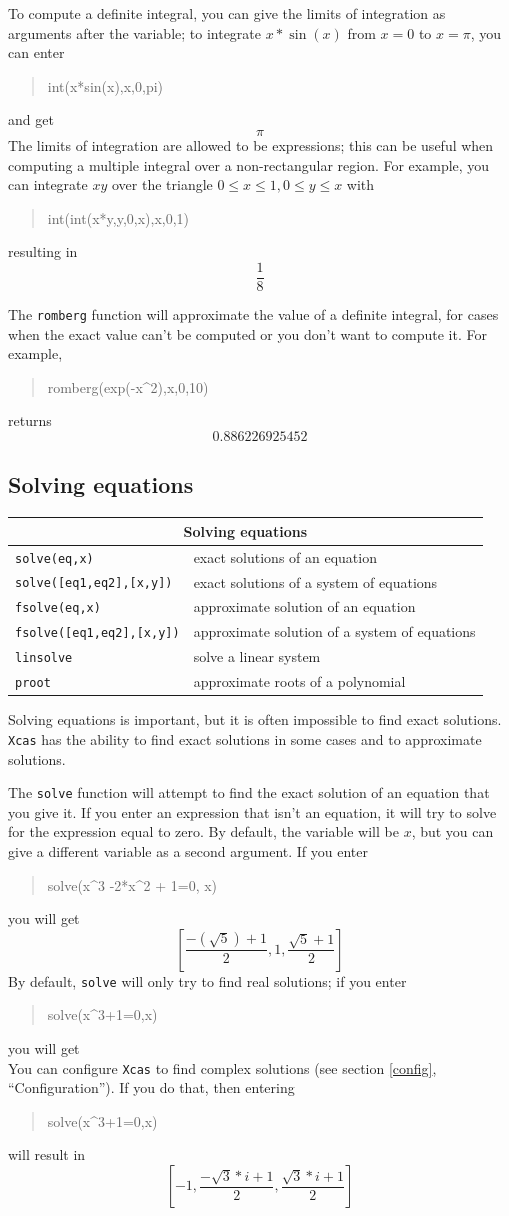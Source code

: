 \documentclass{article}
\newcommand{\xcasin}[1]
{\begin{quote}\ttfamily
#1
\end{quote}}
\newcommand{\xcasout}[1]
{\begin{equation*}
#1
\end{equation*}}
\begin{document}
To compute a definite integral, you can give the limits of integration
as arguments after the variable; to integrate $x*\sin(x)$ from $x=0$ to
$x=\pi$, you can enter
\xcasin{int(x*sin(x),x,0,pi)}
and get
\xcasout{\pi}
The limits of integration are allowed to be expressions; this can be
useful when computing a multiple integral over a non-rectangular
region.  For example, you can integrate $x y$ over the triangle $0 \le
x \le 1, 0 \le y \le x$ with
\xcasin{int(int(x*y,y,0,x),x,0,1)}
resulting in
\xcasout{\frac{1}{8}}

The \texttt{romberg} function will approximate the value of a definite
integral, for cases when the exact value can't be computed or you
don't want to compute it.  For example,
\xcasin{romberg(exp(-x\^{}2),x,0,10)}
returns
\xcasout{0.886226925452}


\subsection{Solving equations}
\label{solve}

\begin{center}
\begin{tabular}{|p{}|p{}|}
\hline
\multicolumn{2}{|c|}{\bf Solving equations}\\
\hline\hline
\texttt{solve(eq,x)} & exact solutions of an  equation\\
\texttt{solve([eq1,eq2],[x,y])} & exact solutions of a system of equations\\
\texttt{fsolve(eq,x)} & approximate solution of an equation\\
\texttt{fsolve([eq1,eq2],[x,y])} & approximate solution of a system of equations\\
\texttt{linsolve} & solve a linear system\\
\texttt{proot} & approximate roots of a polynomial\\
\hline
\end{tabular}
\end{center}

Solving equations is important, but it is often impossible to find
exact solutions.  \texttt{Xcas} has the ability to find exact
solutions in some cases and to approximate solutions.

The \texttt{solve} function will attempt to find the exact solution of
an equation that you give it.  If you enter an expression that isn't
an equation, it will try to solve for the expression equal to zero.
By default, the variable will be $x$, but you can give a different
variable as a second argument.  If you enter 
\xcasin{solve(x\^{}3 -2*x\^{}2 + 1=0, x)}
you will get
\xcasout{\left[\frac{-(\sqrt{5})+1}{2},1,\frac{\sqrt{5}+1}{2}\right]}
By default, \texttt{solve} will only try to find real solutions; if
you enter
\xcasin{solve(x\^{}3+1=0,x)}
you will get
\xcasout{[-1]}
You can configure \texttt{Xcas} to find complex solutions (see
section \ref{config}, ``Configuration'').  If you do that,
then entering
\xcasin{solve(x\^{}3+1=0,x)}
will result in
\xcasout{\left[-1,\frac{-\sqrt{3}*i+1}{2},\frac{\sqrt{3}*i+1}{2}\right]}
\end{document}
